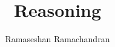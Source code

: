 
\title{Reasoning}
\author[RR]{Ramaseshan Ramachandran}
\date{}

\begin{frame}
	\maketitle
\end{frame}
	
    
